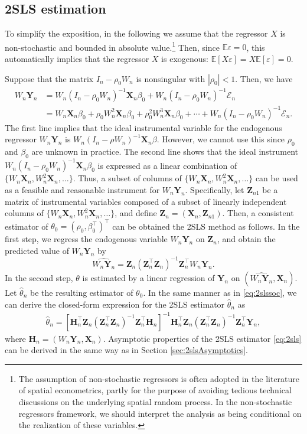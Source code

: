 \documentclass[10.5pt, A4paper, openany, uplatex]{book}
\newcommand{\mbf}{\mathbf}
\newcommand{\mcl}{\mathcal}
\newcommand{\eps}{\varepsilon}
\newcommand{\E}{\mathbb{E}}
\renewcommand{\hat}{\widehat}
\numberwithin{equation}{section}
\begin{document}
\subsection{2SLS estimation}\label{subsec:2sls}

To simplify the exposition, in the following we assume that the regressor $X$ is non-stochastic and bounded in absolute value.\footnote{
	The assumption of non-stochastic regressors is often adopted in the literature of spatial econometrics, partly for the purpose of avoiding tedious technical discussions on the underlying spatial random process.
	In the non-stochastic regressors framework, we should interpret the analysis as being conditional on the realization of these variables.
}
Then, since $\E \eps  = 0$, this automatically implies that the regressor $X$ is exogenous: $\E[X\eps] = X \E[\eps] = 0$.

Suppose that the matrix $I_n - \rho_0 W_n$ is nonsingular with $|\rho_0| < 1$.
Then, we have
\begin{align*}
	W_n \mbf{Y}_n 
	& = W_n(I_n - \rho_0 W_n)^{-1}\mbf{X}_n\beta_0 + W_n (I_n - \rho_0 W_n)^{-1}\mcl{E}_n\\
	& = W_n\mbf{X}_n\beta_0 + \rho_0 W^2_n\mbf{X}_n\beta_0 + \rho^2_0 W^3_n\mbf{X}_n\beta_0 + \cdots +  W_n (I_n - \rho_0 W_n)^{-1}\mcl{E}_n.
\end{align*}
The first line implies that the ideal instrumental variable for the endogenous regressor $W_n\mbf{Y}_n$ is $W_n(I_n - \rho W_n)^{-1}\mbf{X}_n\beta$.
However, we cannot use this since $\rho_0$ and $\beta_0$ are unknown in practice.
The second line shows that the ideal instrument $W_n(I_n - \rho_0 W_n)^{-1}\mbf{X}_n\beta_0$ is expressed as a linear combination of $\{W_n\mbf{X}_n, W^2_n\mbf{X}_n, \ldots\}$.
Thus, a subset of columns of $\{W_n\mbf{X}_n, W^2_n\mbf{X}_n, \ldots\}$ can be used as a feasible and reasonable instrument for $W_n\mbf{Y}_n$.
Specifically, let $\mbf{Z}_{n1}$ be a matrix of instrumental variables composed of a subset of linearly independent columns of $\{W_n\mbf{X}_n, W^2_n\mbf{X}_n, \ldots\}$, and define $\mbf{Z}_n = (\mbf{X}_n, \mbf{Z}_{n1})$.
Then, a consistent estimator of $\theta_0 = (\rho_0, \beta_0^\top)^\top$ can be obtained the 2SLS method as follows.
In the first step, we regress the endogenous variable $W_n \mbf{Y}_n$ on $\mbf{Z}_n$, and obtain the predicted value of $W_n\mbf{Y}_n$ by 
\[
	\hat{W_n\mbf{Y}_n} = \mbf{Z}_n(\mbf{Z}_n^\top \mbf{Z}_n)^{-1}\mbf{Z}_n^\top W_n \mbf{Y}_n.
\]
In the second step, $\theta$ is estimated by a linear regression of $\mbf{Y}_n$ on $(\hat{W_n\mbf{Y}_n}, \mbf{X}_n)$.
Let $\hat \theta_n$ be the resulting estimator of $\theta_0$.
In the same manner as in \eqref{eq:2slssoc}, we can derive the closed-form expression for the 2SLS estimator $\hat \theta_n$ as
\begin{align}\label{eq:2sls}
	\hat \theta_n = \left[\mbf{H}_n^\top \mbf{Z}_n(\mbf{Z}_n^\top \mbf{Z}_n)^{-1}\mbf{Z}_n^\top \mbf{H}_n  \right]^{-1}\mbf{H}_n^\top \mbf{Z}_n(\mbf{Z}_n^\top \mbf{Z}_n)^{-1}\mbf{Z}_n^\top\mbf{Y}_n,
\end{align}
 where $\mbf{H}_n = (W_n\mbf{Y}_n, \mbf{X}_n)$. 
Asymptotic properties of the 2SLS estimator \eqref{eq:2sls} can be derived in the same way as in Section \ref{sec:2slsAsymptotics}.
\end{document}
